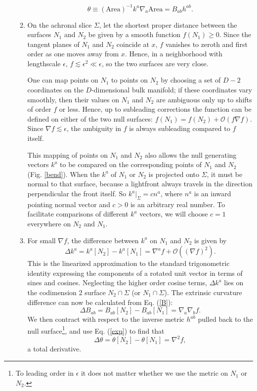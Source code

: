 \documentclass{article}
\begin{document}
\begin{enumerate}
\begin{enumerate}
\begin{equation}\label{exp}
\theta \equiv (\mathrm{Area})^{-1} k^a \nabla_a \mathrm{Area} = B_{ab} h^{ab}.
\end{equation}
	\item On the achronal slice $\Sigma$, let the shortest proper distance between the surfaces $N_1$ and $N_2$ be given by a smooth function $f(N_1) \ge 0$.  Since the tangent planes of $N_1$ and $N_2$ coincide at $x$, $f$ vanishes to zeroth and first order as one moves away from $x$.  Hence, in a neighborhood with lengthscale $\epsilon$, $f \lesssim \epsilon^2 \ll \epsilon$, so the two surfaces are very close.

One can map points on $N_1$ to points on $N_2$ by choosing a set of $D-2$ coordinates on the $D$-dimensional bulk manifold; if these coordinates vary smoothly, then their values on $N_1$ and $N_2$ are ambiguous only up to shifts of order $f$ or less.   Hence, up to subleading corrections the function can be defined on either of the two null surfaces: $f(N_1) = f(N_2) + \mathcal{O}(f \nabla f)$.  Since $\nabla f \lesssim \epsilon$, the ambiguity in $f$ is always subleading compared to $f$ itself.

This mapping of points on $N_1$ and $N_2$ also allows the null generating vectors $k^a$ to be compared on the corresponding points of $N_1$ and $N_2$ (Fig. \ref{bend}).  When the $k^a$ of $N_1$ or $N_2$ is projected onto $\Sigma$, it must be normal to that surface, because a lightfront always travels in the direction perpendicular the front itself.  So $k^a|_\Sigma = c n^a$, where $n^a$ is an inward pointing normal vector and $c > 0$ is an arbitrary real number.  To facilitate comparisons of different $k^a$ vectors, we will choose $c = 1$ everywhere on $N_2$ and $N_1$.
	\item For small $\nabla f$, the difference between $k^a$ on $N_1$ and $N_2$ is given by
\begin{equation}
\Delta k^a = k^{a}[N_2] - k^{a}[N_1] = \nabla^a f + \mathcal{O}((\nabla f)^2).
\end{equation}
This is the linearized approximation to the standard trigonometric identity expressing the components of a rotated unit vector in terms of sines and cosines.  Neglecting the higher order cosine terms, $\Delta k^a$ lies on the codimension 2 surface $N_2 \cap \Sigma$ (or $N_1 \cap \Sigma$).  The extrinsic curvature difference can now be calculated from Eq. (\ref{B}):
\begin{equation}
\Delta B_{ab} = B_{ab}[N_2] - B_{ab}[N_1] = \nabla_a \nabla_b f.
\end{equation}
We then contract with respect to the inverse metric $h^{ab}$ pulled back to the null surface\footnote{To leading order in $\epsilon$ it does not matter whether we use the metric on $N_1$ or $N_2$.}, and use Eq. (\ref{exp}) to find that
\begin{equation}
\Delta \theta = \theta[N_2] - \theta[N_1] = \nabla^2 f,
\end{equation}
a total derivative.  


\end{enumerate}
\end{enumerate}
\end{document}
